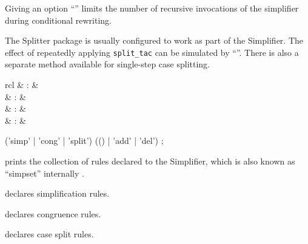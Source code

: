 \begin{isabellebody}
\begin{isamarkuptext}
  Giving an option ``'' limits the number of
  recursive invocations of the simplifier during conditional
  rewriting.

  \medskip The Splitter package is usually configured to work as part
  of the Simplifier.  The effect of repeatedly applying \verb|split_tac| can be simulated by ``''.  There is also a separate 
  method available for single-step case splitting.%
\end{isamarkuptext}%
\isamarkuptrue%
%
\isamarkuptrue%
%
\begin{isamarkuptext}%
\begin{matharray}{rcl}
    \mbox{}\isa{{\isachardoublequote}\isactrlsup {\isacharasterisk}{\isachardoublequote}} & : &  \\
    \mbox{} & : & \isaratt \\
    \mbox{} & : & \isaratt \\
    \mbox{} & : & \isaratt \\
  \end{matharray}

  \begin{rail}
    ('simp' | 'cong' | 'split') (() | 'add' | 'del')
    ;
  \end{rail}

  \begin{descr}

  \item [\mbox{\isa{\isacommand{print{\isacharunderscore}simpset}}}] prints the collection of rules
  declared to the Simplifier, which is also known as ``simpset''
  internally \cite{isabelle-ref}.

  \item [\mbox{\isa{simp}}] declares simplification rules.

  \item [\mbox{\isa{cong}}] declares congruence rules.

  \item [\mbox{\isa{split}}] declares case split rules.


\end{descr}
\end{isamarkuptext}
\end{isabellebody}

